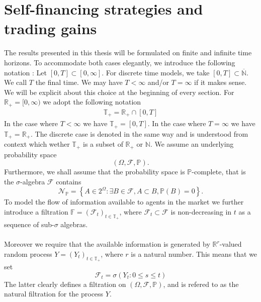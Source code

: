 \documentclass[11pt,a4paper,twoside,openany]{report}
\theoremstyle{plain} %
\theoremstyle{definition} %
\theoremstyle{remark} %
\begin{document}
\section{Self-financing strategies and trading gains}
The results presented in this thesis will be formulated on finite and infinite time horizons. To accommodate both cases elegantly, we introduce the following notation
: Let \([0,T]\subset[0,\infty]\). For discrete time models, we take \([0,T]\subset\overline{\mathbb{N}}\). We call \(T\) the final time. We may have \(T<\infty\) and/or \(T=\infty\) if it makes sense. We will be explicit about this choice at the beginning of every section. For \(\mathbb{R}_+=[0,\infty)\) we adopt the following notation 
\begin{align}
    \mathbb{T}_+=\mathbb{R}_+\cap [0,T]
\end{align}
In the case where \(T<\infty\) we have \(\mathbb{T}_+=[0,T]\). In the case where \(T=\infty\) we have \(\mathbb{T}_+=\mathbb{R}_+\). The discrete case is denoted in the same way and is understood from context which wether \(\mathbb{T}_+\) is a subset of \(\mathbb{R}_+\) or \(\mathbb{N}\).
\bigbreak
We assume an underlying probability space 
\begin{equation}
    (\Omega,\mathcal{F},\mathbb{P}).
\end{equation}
Furthermore, we shall assume that the probability space is \(\mathbb{P}\)-complete, that is the \(\sigma\)-algebra \(\mathcal{F}\) contains 
\begin{equation}\label{eq:nullsets}
    \mathcal{N}_{\mathbb{P}}=\left\{A\in2^{\Omega}:\exists B\in\mathcal{F}, A\subset B, \mathbb{P}(B)=0\right\}.
\end{equation} 
To model the flow of information available to agents in the market we further introduce a filtration  \(\mathbb{F}=(\mathcal{F}_t)_{t\in \mathbb{T}_+}\), where
\(\mathcal{F}_t\subset\mathcal{F}\) is non-decreasing in \(t\) as a sequence of sub-\(\sigma\) algebras.\\\\
Moreover we require that the available information is generated by  \(\mathbb{R}^{r}\)-valued random process \(Y=(Y_t)_{t\in \mathbb{T}_+}\), where \(r\) is a natural number. This means that we set 
\begin{equation}\label{eq:filtration generated by market information process}
    \mathcal{F}_t=\sigma(Y_t:0\leq s\leq t)
\end{equation}
The latter clearly defines a filtration on \((\Omega,\mathcal{F},\mathbb{P})\), and is refered to as the natural filtration for the process \(Y\).
\end{document}
